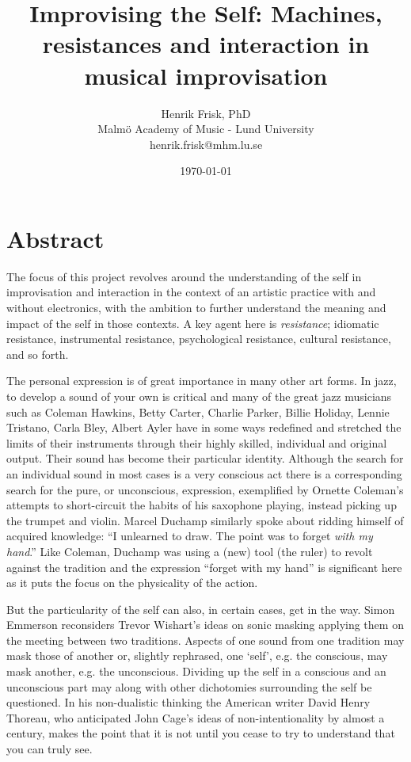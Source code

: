 \documentclass[a4paper]{article}
\title{Improvising the Self: Machines, resistances and interaction in musical improvisation}
\author{Henrik Frisk, PhD\\{\small Malmö Academy of Music - Lund University}\\{\small henrik.frisk@mhm.lu.se}}
\date{\today}
\begin{document}
\maketitle

\thispagestyle{empty}

\section{Abstract}


The focus of this project revolves around the understanding of the self in improvisation and interaction in the context of an artistic practice with and without electronics, with the ambition to further understand the meaning and impact of the self in those contexts. A key agent here is \emph{resistance}; idiomatic resistance, instrumental resistance, psychological resistance, cultural resistance, and so forth.

The personal expression is of great importance in many other art forms. In jazz, to develop a sound of your own is critical and many of the great jazz musicians such as Coleman Hawkins, Betty Carter, Charlie Parker, Billie Holiday, Lennie Tristano, Carla Bley, Albert Ayler have in some ways redefined and stretched the limits of their instruments through their highly skilled, individual and original output. Their sound has become their particular identity. Although the search for an individual sound in most cases is a very conscious act there is a corresponding search for the pure, or unconscious, expression, exemplified by Ornette Coleman's attempts to short-circuit the habits of his   saxophone playing, instead picking up the trumpet and violin. Marcel Duchamp similarly spoke about ridding himself of acquired knowledge: ``I unlearned to draw. The  point was to forget \emph{with my hand}.'' 
Like Coleman, Duchamp was using a (new) tool (the ruler) to revolt against the tradition and the expression ``forget with my hand'' is significant here as it puts the focus on the physicality of the action.

But the particularity of the self can also, in certain cases, get in the way. Simon Emmerson reconsiders Trevor Wishart's ideas on sonic masking applying them on the meeting between two traditions. Aspects of one sound from one tradition may mask those of another or, slightly rephrased, one `self', e.g. the conscious, may mask another, e.g. the unconscious. Dividing up the self in a conscious and an unconscious part may along with other dichotomies surrounding the self be questioned. In his non-dualistic thinking the American writer David Henry Thoreau, who anticipated John Cage's ideas of non-intentionality by almost a century, makes the point that it is not until you cease to try to understand that you can truly see.
 
\end{document}
